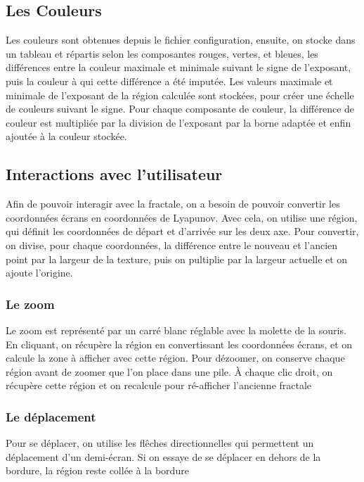 \documentclass{article}
\begin{document}
    \subsection{Les Couleurs}

    Les couleurs sont obtenues depuis le fichier configuration, ensuite, on stocke dans un tableau et répartis selon les composantes rouges, vertes, et bleues, les différences entre la couleur maximale et minimale suivant le signe de l'exposant, puis la couleur à qui cette différence a été imputée.
    Les valeurs maximale et minimale de l'exposant de la région calculée sont stockées, pour créer une échelle de couleurs suivant le signe.
    Pour chaque composante de couleur, la différence de couleur est multipliée par la division de l'exposant par la borne adaptée et enfin ajoutée à la couleur stockée.

    \subsection{Interactions avec l'utilisateur}

    Afin de pouvoir interagir avec la fractale, on a besoin de pouvoir convertir les coordonnées écrans en coordonnées de Lyapunov.
    Avec cela, on utilise une région, qui définit les coordonnées de départ et d'arrivée sur les deux axe.
    Pour convertir, on divise, pour chaque coordonnées, la différence entre le nouveau et l'ancien point par la largeur de la texture, puis on pultiplie par la largeur actuelle et on ajoute l'origine.

    \subsubsection{Le zoom}

    Le zoom est représenté par un carré blanc réglable avec la molette de la souris.
    En cliquant, on récupère la région en convertissant les coordonnées écrans, et on calcule la zone à afficher avec cette région.
    Pour dézoomer, on conserve chaque région avant de zoomer que l'on place dans une pile.
    À chaque clic droit, on récupère cette région et on recalcule pour ré-afficher l'ancienne fractale

    \subsubsection{Le déplacement}

    Pour se déplacer, on utilise les flêches directionnelles qui permettent un déplacement d'un demi-écran.
    Si on essaye de se déplacer en dehors de la bordure, la région reste collée à la bordure
\end{document}

